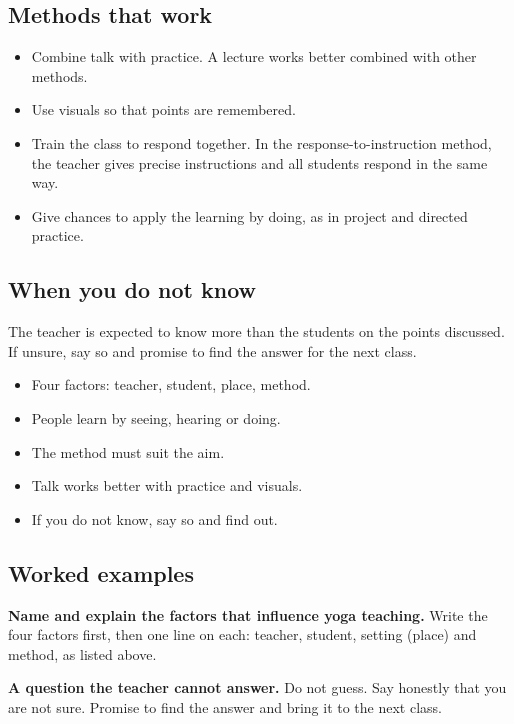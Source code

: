 \subsection*{Methods that work}

\begin{itemize}
\item Combine talk with practice. A lecture works better combined with other methods.
\item Use visuals so that points are remembered.
\item Train the class to respond together. In the response-to-instruction method, the teacher gives precise instructions and all students respond in the same way.
\item Give chances to apply the learning by doing, as in project and directed practice.
\end{itemize}

\subsection*{When you do not know}

The teacher is expected to know more than the students on the points discussed. If unsure, say so and promise to find the answer for the next class.

\begin{recall}
\begin{itemize}
\item Four factors: teacher, student, place, method.
\item People learn by seeing, hearing or doing.
\item The method must suit the aim.
\item Talk works better with practice and visuals.
\item If you do not know, say so and find out.
\end{itemize}
\end{recall}

\subsection*{Worked examples}

\textbf{Name and explain the factors that influence yoga teaching.} Write the four factors first, then one line on each: teacher, student, setting (place) and method, as listed above.

\textbf{A question the teacher cannot answer.} Do not guess. Say honestly that you are not sure. Promise to find the answer and bring it to the next class.

